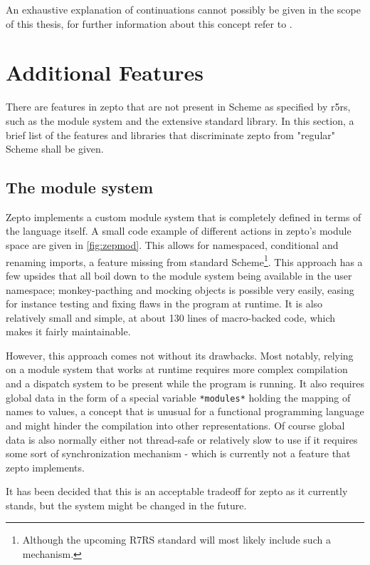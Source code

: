 \documentclass[oneside,11pt,xetex]{scrbook}
\begin{document}
An exhaustive explanation of continuations cannot possibly be given in the scope
of this thesis, for further information about this concept refer to \parencite{CONT}.

\section{Additional Features}

There are features in zepto that are not present in Scheme as specified by \gls{r5rs}, such
as the module system and the extensive standard library. In this section, a brief list of
the features and libraries that discriminate zepto from "regular" Scheme shall be given.

\subsection{The module system}

Zepto implements a custom module system that is completely defined in terms of the language
itself. A small code example of different actions in zepto's module space are given in \ref{fig:zepmod}.
This allows for namespaced, conditional and renaming imports, a feature missing from standard
Scheme\footnote{Although the upcoming R7RS standard will most likely include such a mechanism.}.
This approach has a few upsides that all boil down to the module system being available in the
user namespace; monkey-pacthing and mocking objects is possible very easily, easing for instance
testing and fixing flaws in the program at runtime. It is also relatively small and simple,
at about 130 lines of macro-backed code, which makes it fairly maintainable.

However, this approach comes not without its drawbacks. Most notably, relying on a module
system that works at runtime requires more complex compilation and a dispatch system to
be present while the program is running. It also requires global data in the form of a
special variable \texttt{*modules*} holding the mapping of names to values, a concept that is
unusual for a functional programming language and might hinder the compilation into other
representations. Of course global data is also normally either not thread-safe or relatively
slow to use if it requires some sort of synchronization mechanism - which is currently not
a feature that zepto implements.

It has been decided that this is an acceptable tradeoff for zepto as it currently stands,
but the system might be changed in the future.
\end{document}
